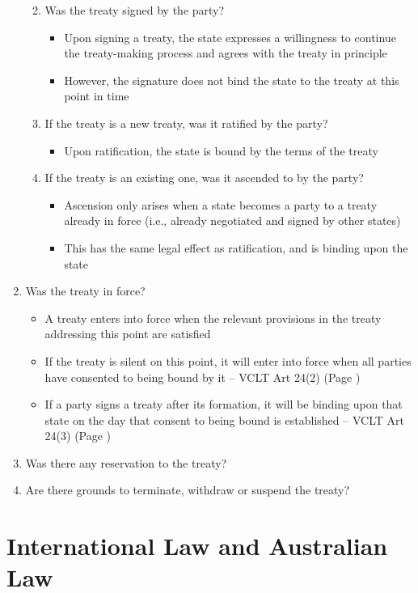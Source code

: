\begin{enumerate}
\begin{enumerate}
\begin{enumerate}
        \end{enumerate}
        \item Was the treaty signed by the party?
        \begin{itemize}
            \item Upon signing a treaty, the state expresses a willingness to continue the treaty-making process and agrees with the treaty in principle
            \item However, the signature does not bind the state to the treaty at this point in time
        \end{itemize}
        \item If the treaty is a new treaty, was it ratified by the party?
        \begin{itemize}
            \item Upon ratification, the state is bound by the terms of the treaty
        \end{itemize}
        \item If the treaty is an existing one, was it ascended to by the party?
        \begin{itemize}
            \item Ascension only arises when a state becomes a party to a treaty already in force (i.e., already negotiated and signed by other states)
            \item This has the same legal effect as ratification, and is binding upon the state
        \end{itemize}
    \end{enumerate}
    \item Was the treaty in force?
    \begin{itemize}
        \item A treaty enters into force when the relevant provisions in the treaty addressing this point are satisfied
        \item If the treaty is silent on this point, it will enter into force when all parties have consented to being bound by it -- VCLT Art 24(2) (Page \pageref{VCLT Art 24})
        \item If a party signs a treaty after its formation, it will be binding upon that state on the day that consent to being bound is established -- VCLT Art 24(3) (Page \pageref{VCLT Art 24})
    \end{itemize}
    \item Was there any reservation to the treaty?
    \item Are there grounds to terminate, withdraw or suspend the treaty?
\end{enumerate}

\section{International Law and Australian Law}
